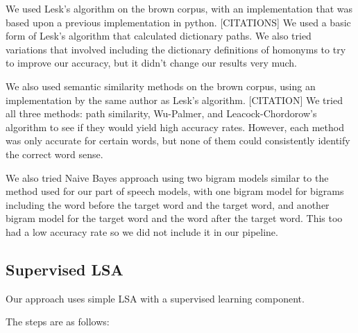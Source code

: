 \documentclass[10pt, letterpaper]{article}
\begin{document}
        We used Lesk's algorithm on the brown corpus, with an implementation that was based upon a previous implementation in python. [CITATIONS] We used a basic form of Lesk's algorithm that calculated dictionary paths. We also tried variations that involved including the dictionary definitions of homonyms to try to improve our accuracy, but it didn't change our results very much.

        We also used semantic similarity methods on the brown corpus, using an implementation by the same author as Lesk's algorithm. [CITATION] We tried all three methods: path similarity, Wu-Palmer, and Leacock-Chordorow's algorithm to see if they would yield high accuracy rates. However, each method was only accurate for certain words, but none of them could consistently identify the correct word sense.
        
        We also tried Naive Bayes approach using two bigram models similar to the method used for our part of speech models, with one bigram model for bigrams including the word before the target word and the target word, and another bigram model for the target word and the word after the target word. This too had a low accuracy rate so we did not include it in our pipeline.
	\subsection{Supervised LSA}
	Our approach uses simple LSA with a supervised learning component. 

	The steps are as follows: 
\end{document}

